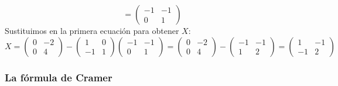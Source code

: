 \documentclass[a4paper,12pt]{article}
\begin{document}
\begin{ejercicio}[title=Ejercicio 24]
\[=
\boxed{
\begin{pmatrix}
-1 & -1\\[4pt]
0 & 1
\end{pmatrix}
}
\]
Sustituimos en la primera ecuación para obtener \(X\):
\[
X =
\begin{pmatrix}
0 & -2\\
0 & 4
\end{pmatrix}
-
\begin{pmatrix}
1 & 0\\
-1 & 1
\end{pmatrix}
\begin{pmatrix}
-1 & -1\\
0 & 1
\end{pmatrix}
=
\begin{pmatrix}
0 & -2\\
0 & 4
\end{pmatrix}
-
\begin{pmatrix}
-1 & -1\\
1 & 2
\end{pmatrix}
=
\boxed{
\begin{pmatrix}
1 & -1\\
-1 & 2
\end{pmatrix}
}
\]
\end{ejercicio}

\subsubsection{La fórmula de Cramer}
\end{document}
